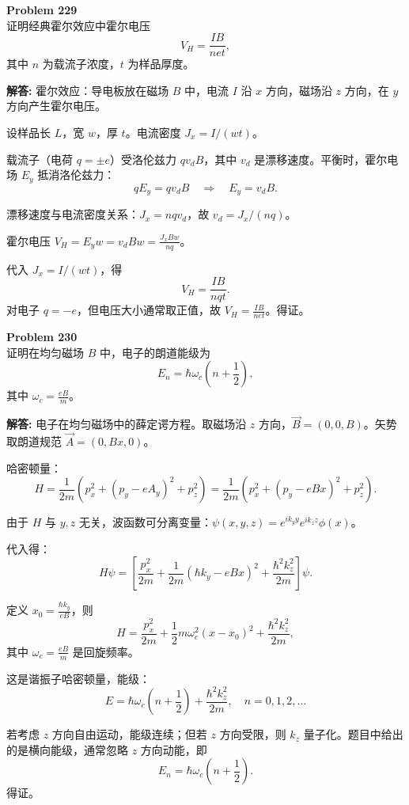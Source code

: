 \documentclass[12pt, a4paper, oneside]{ctexart}
\newenvironment{solution}{\par\noindent\textbf{解答:}\quad}{\par}
\begin{document}
\begin{mdframed}[backgroundcolor=gray!10, linewidth=0pt]
    \textbf{Problem 229} \\
    证明经典霍尔效应中霍尔电压
    \[
    V_H = \frac{I B}{n e t},
    \]
    其中 $n$ 为载流子浓度，$t$ 为样品厚度。
\end{mdframed}
\begin{solution}
    霍尔效应：导电板放在磁场 $B$ 中，电流 $I$ 沿 $x$ 方向，磁场沿 $z$ 方向，在 $y$ 方向产生霍尔电压。
    
    设样品长 $L$，宽 $w$，厚 $t$。电流密度 $J_x = I/(w t)$。
    
    载流子（电荷 $q = \pm e$）受洛伦兹力 $q v_d B$，其中 $v_d$ 是漂移速度。平衡时，霍尔电场 $E_y$ 抵消洛伦兹力：
    \[
    q E_y = q v_d B \quad \Rightarrow \quad E_y = v_d B.
    \]
    
    漂移速度与电流密度关系：$J_x = n q v_d$，故 $v_d = J_x/(n q)$。
    
    霍尔电压 $V_H = E_y w = v_d B w = \frac{J_x B w}{n q}$。
    
    代入 $J_x = I/(w t)$，得
    \[
    V_H = \frac{I B}{n q t}.
    \]
    对电子 $q = -e$，但电压大小通常取正值，故 $V_H = \frac{I B}{n e t}$。得证。
\end{solution}

\begin{mdframed}[backgroundcolor=gray!10, linewidth=0pt]
    \textbf{Problem 230} \\
    证明在均匀磁场 $B$ 中，电子的朗道能级为
    \[
    E_n = \hbar \omega_c \left( n + \frac{1}{2} \right),
    \]
    其中 $\omega_c = \frac{e B}{m}$。
\end{mdframed}
\begin{solution}
    电子在均匀磁场中的薛定谔方程。取磁场沿 $z$ 方向，$\vec{B} = (0,0,B)$。矢势取朗道规范 $\vec{A} = (0, B x, 0)$。
    
    哈密顿量：
    \[
    H = \frac{1}{2m} \left( p_x^2 + \left( p_y - e A_y \right)^2 + p_z^2 \right) = \frac{1}{2m} \left( p_x^2 + (p_y - e B x)^2 + p_z^2 \right).
    \]
    
    由于 $H$ 与 $y, z$ 无关，波函数可分离变量：$\psi(x,y,z) = e^{i k_y y} e^{i k_z z} \phi(x)$。
    
    代入得：
    \[
    H \psi = \left[ \frac{p_x^2}{2m} + \frac{1}{2m} ( \hbar k_y - e B x )^2 + \frac{\hbar^2 k_z^2}{2m} \right] \psi.
    \]
    
    定义 $x_0 = \frac{\hbar k_y}{e B}$，则
    \[
    H = \frac{p_x^2}{2m} + \frac{1}{2} m \omega_c^2 (x - x_0)^2 + \frac{\hbar^2 k_z^2}{2m},
    \]
    其中 $\omega_c = \frac{e B}{m}$ 是回旋频率。
    
    这是谐振子哈密顿量，能级：
    \[
    E = \hbar \omega_c \left( n + \frac{1}{2} \right) + \frac{\hbar^2 k_z^2}{2m}, \quad n=0,1,2,\dots
    \]
    
    若考虑 $z$ 方向自由运动，能级连续；但若 $z$ 方向受限，则 $k_z$ 量子化。题目中给出的是横向能级，通常忽略 $z$ 方向动能，即
    \[
    E_n = \hbar \omega_c \left( n + \frac{1}{2} \right).
    \]
    得证。
\end{solution}
\end{document}
